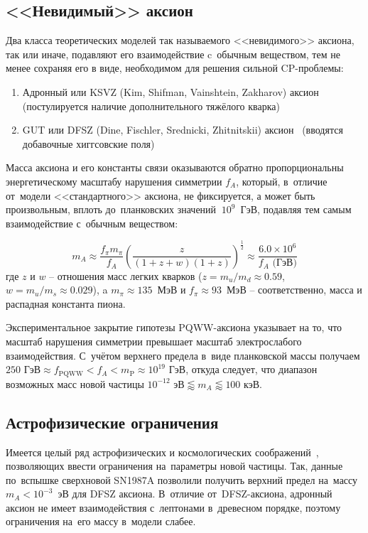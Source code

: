\documentclass[a4paper,article,14pt]{extarticle}
\begin{document}
\subsection{<<Невидимый>> аксион}
Два класса теоретических моделей так называемого <<невидимого>> аксиона, так или иначе, подавляют его взаимодействие c~обычным веществом, тем не менее сохраняя его в виде, необходимом для решения сильной CP-проблемы:
\begin{enumerate}
    \item Адронный или KSVZ (Kim, Shifman, Vainshtein, Zakharov) аксион~\cite{K,SVZ} (постулируется наличие дополнительного тяжёлого кварка)
    \item GUT или DFSZ (Dine, Fischler, Srednicki, Zhitnitskii) аксион~\cite{DFS,Z} (вводятся добавочные хиггсовские поля)
\end{enumerate}
Масса аксиона и его константы связи оказываются обратно пропорциональны энергетическому масштабу нарушения симметрии $f_A$, который, в~отличие от~модели <<стандартного>> аксиона, не фиксируется, а может быть произвольным, вплоть до~планковских значений $~10^9$~ГэВ, подавляя тем самым взаимодействие с~обычным веществом:

\begin{equation}\label{mA}
    m_A \approx
        \frac{f_\pi m_\pi}{f_A}
        \left(
            \frac{z}{(1 + z +w) (1 + z)}
        \right)^{\frac{1}{2}} \approx
        \frac{6.0 \times 10^6}{f_A \text{\ (ГэВ})}
\end{equation}
где $z$ и $w$ -- отношения масс легких кварков ($z = m_u/m_d \approx 0.59$, $w = m_u/m_s \approx 0.029$), a $m_{\pi} \approx 135$~МэВ и $f_{\pi} \approx 93$~МэВ -- соответственно, масса и распадная константа пиона.

Экспериментальное закрытие гипотезы PQWW-аксиона указывает на то, что масштаб нарушения симметрии превышает масштаб электрослабого взаимодействия.
С~учётом верхнего предела в~виде планковской массы получаем $250 \text{ ГэВ} \approx f_{\text{PQWW}} < f_A < m_{\mathrm{P}} \approx 10^{19} \text{ ГэВ} $, откуда следует, что диапазон возможных масс новой частицы $10^{-12} \text{\ эВ} \lessapprox m_A \lessapprox 100 \text{\ кэВ}$.

\subsection{Астрофизические ограничения}
Имеется целый ряд астрофизических и космологических соображений~\cite{turner1990windows,Raffelt:1995ym,raffelt1990astrophysical}, позволяющих ввести ограничения на~параметры новой частицы.
Так, данные по~вспышке сверхновой SN1987A позволили получить верхний предел на~массу $m_A < 10^{-3}$~эВ для DFSZ аксиона.
В~отличие от~DFSZ-аксиона, адронный аксион не имеет взаимодействия с~лептонами в~древесном порядке, поэтому ограничения на~его массу в~модели слабее. 
\end{document}
